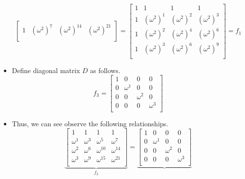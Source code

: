 \documentclass{article}
\begin{document}
\begin{itemize}
\begin{equation*}
\begin{bmatrix}
            1 & \left( \omega^2 \right)^7 & \left( \omega^2 \right)^{14} & \left( \omega^2 \right)^{21}\\
        \end{bmatrix}
        =
        \begin{bmatrix}
            1 & 1 & 1 & 1\\
            1 & \left( \omega^2 \right)^1 & \left( \omega^2 \right)^2 & \left( \omega^2 \right)^3\\
            1 & \left( \omega^2 \right)^2 & \left( \omega^2 \right)^4 & \left( \omega^2 \right)^6\\
            1 & \left( \omega^2 \right)^3 & \left( \omega^2 \right)^6 & \left( \omega^2 \right)^9\\
        \end{bmatrix}
        = f_1
    \end{equation*}
    \item Define diagonal matrix $D$ as follows.
    \begin{equation*}
        f_3 =
        \begin{bmatrix}
            1 & 0 & 0 & 0\\
            0 & \omega^1 & 0 & 0\\
            0 & 0 & \omega^2 & 0\\
            0 & 0 & 0 & \omega^3\\
        \end{bmatrix}
    \end{equation*}
    \item Thus, we can see observe the following relationships.
    \begin{equation*}
        \underbrace{
            \begin{bmatrix}
                1 & 1 & 1 & 1\\
                \omega^1 & \omega^3 & \omega^5    & \omega^7   \\
                \omega^2 & \omega^6 & \omega^{10} & \omega^{14}\\
                \omega^3 & \omega^9 & \omega^{15} & \omega^{21}\\
            \end{bmatrix}
        }_{f_2} = \underbrace{
            \begin{bmatrix}
                1 & 0 & 0 & 0\\
                0 & \omega^1 & 0 & 0\\
                0 & 0 & \omega^2 & 0\\
                0 & 0 & 0 & \omega^3\\

\end{bmatrix}}
\end{equation*}
\end{itemize}
\end{document}
